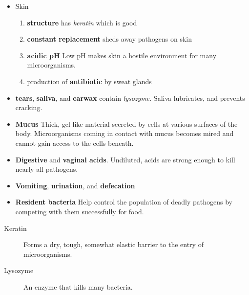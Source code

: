 \documentclass[11pt]{article}
\begin{document}
\begin{itemize}
\item Skin
\begin{enumerate}
\item \textbf{structure} has \emph{keratin} which is good
\item \textbf{constant replacement} sheds away pathogens on skin
\item \textbf{acidic pH} Low pH makes skin a hostile environment for many microorganisms.
\item production of \textbf{antibiotic} by sweat glands
\end{enumerate}
\item \textbf{tears}, \textbf{saliva}, and \textbf{earwax} contain \emph{lysozyme}. Saliva lubricates, and prevents
cracking.
\item \textbf{Mucus} Thick, gel-like material secreted by cells at various surfaces of the
body. Microorganisms coming in contact with mucus becomes mired and cannot
gain access to the cells beneath.
\item \textbf{Digestive} and \textbf{vaginal acids}. Undiluted, acids are strong enough to kill nearly
all pathogens.
\item \textbf{Vomiting}, \textbf{urination}, and \textbf{defecation}
\item \textbf{Resident bacteria} Help control the population of deadly pathogens by competing
with them successfully for food.
\end{itemize}


\begin{description}
\item[{Keratin}] Forms a dry, tough, somewhat elastic barrier to the entry of
microorganisms.
\item[{Lysozyme}] An enzyme that kills many bacteria.
\end{description}
\end{document}
